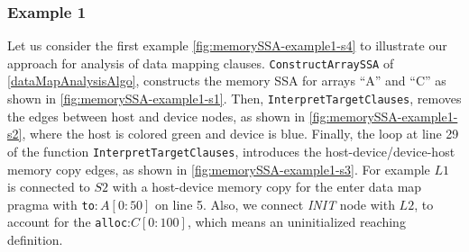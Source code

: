 \subsubsection{Example 1}
Let us consider the first example \autoref{fig:memorySSA-example1-s4}
to illustrate our approach for analysis of data mapping clauses.
\texttt{ConstructArraySSA} of \autoref{dataMapAnalysisAlgo},  
constructs the memory SSA for arrays ``A'' and ``C'' as shown in \autoref{fig:memorySSA-example1-s1}.
Then, \texttt{InterpretTargetClauses}, removes 
the edges between host and device nodes, as shown in 
\autoref{fig:memorySSA-example1-s2}, where the host is 
colored green and device is blue.
Finally, the loop at line 29 of the function \texttt{InterpretTargetClauses}, 
introduces the host-device/device-host 
memory copy edges, as shown in 
\autoref{fig:memorySSA-example1-s3}. For example
$L1$ is connected to $S2$
with a host-device memory copy for the enter data map 
pragma with \texttt{to}$:A[0:50]$ on line 5. 
Also, we connect \textit{INIT} node with $L2$, 
to account for the \texttt{alloc}:$C[0:100]$, which means 
an uninitialized reaching definition. 

